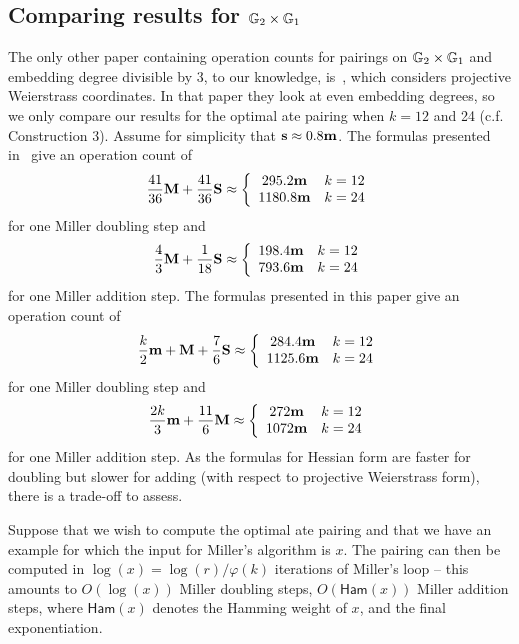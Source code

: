 \subsection{Comparing results for $\mathbb{G}_{2} \times \mathbb{G}_{1}$}

The only other paper containing operation counts for pairings on $\mathbb{G}_{2} \times \mathbb{G}_{1}$
and embedding degree divisible by 3, to our knowledge, is~\cite{2009/craig}, which considers projective Weierstrass coordinates.
In that paper they look at even embedding degrees, so we only compare our results
for the optimal ate pairing when $k=12$ and 24 (c.f. Construction 3).
Assume for simplicity that $\textbf{s} \approx 0.8\textbf{m}$.
The formulas presented in~\cite{2009/craig} give an operation count of
$$\frac{41}{36}\textbf{M} + \frac{41}{36}\textbf{S} \approx
\left\{ \begin{array}{cc}
295.2\textbf{m} & k=12 \\
1180.8\textbf{m} & k=24
\end{array} \right.$$ 
for one Miller doubling step
and
$$\frac{4}{3}\textbf{M} + \frac{1}{18}\textbf{S} \approx
\left\{ \begin{array}{cc}
198.4\textbf{m} & k=12 \\
793.6\textbf{m} & k=24
\end{array} \right.$$ 
for one Miller addition step.
The formulas presented in this paper give an operation count of
$$\frac{k}{2}\textbf{m} + \textbf{M} + \frac{7}{6}\textbf{S} \approx
\left\{ \begin{array}{cc}
284.4\textbf{m} & k=12 \\
1125.6\textbf{m} & k=24
\end{array} \right.$$ 
for one Miller doubling step
and
$$\frac{2k}{3}\textbf{m} + \frac{11}{6}\textbf{M} \approx
\left\{ \begin{array}{cc}
272\textbf{m} & k=12 \\
1072\textbf{m} & k=24
\end{array} \right.$$ 
for one Miller addition step.
As the formulas for Hessian form are faster for doubling but slower for adding (with respect to projective Weierstrass form), there is a trade-off to assess.

Suppose that we wish to compute the optimal ate pairing and that we have 
an example for which the input for Miller's algorithm is $x$. 
The pairing can then be computed in $\log(x) = \log(r)/\varphi(k)$
iterations of Miller's loop -- this amounts to $O(\log(x))$ Miller doubling steps,
$O(\mathsf{Ham}(x))$ Miller addition steps, where $\mathsf{Ham}(x)$ denotes the Hamming weight of $x$, and the final exponentiation.

